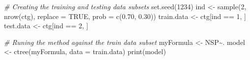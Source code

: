 \documentclass[
]{article}
\newenvironment{Shaded}{\begin{snugshade}}{\end{snugshade}}
\newcommand{\AttributeTok}[1]{\textcolor[rgb]{0.77,0.63,0.00}{#1}}
\newcommand{\CommentTok}[1]{\textcolor[rgb]{0.56,0.35,0.01}{\textit{#1}}}
\newcommand{\ConstantTok}[1]{\textcolor[rgb]{0.00,0.00,0.00}{#1}}
\newcommand{\DecValTok}[1]{\textcolor[rgb]{0.00,0.00,0.81}{#1}}
\newcommand{\FloatTok}[1]{\textcolor[rgb]{0.00,0.00,0.81}{#1}}
\newcommand{\FunctionTok}[1]{\textcolor[rgb]{0.00,0.00,0.00}{#1}}
\newcommand{\NormalTok}[1]{#1}
\newcommand{\OtherTok}[1]{\textcolor[rgb]{0.56,0.35,0.01}{#1}}
\newcommand{\SpecialCharTok}[1]{\textcolor[rgb]{0.00,0.00,0.00}{#1}}
\begin{document}
\begin{Shaded}
\begin{Highlighting}[]
\CommentTok{\# Creating the training and testing data subsets}
\FunctionTok{set.seed}\NormalTok{(}\DecValTok{1234}\NormalTok{)}
\NormalTok{ind }\OtherTok{\textless{}{-}} \FunctionTok{sample}\NormalTok{(}\DecValTok{2}\NormalTok{, }\FunctionTok{nrow}\NormalTok{(ctg), }\AttributeTok{replace =} \ConstantTok{TRUE}\NormalTok{, }\AttributeTok{prob =} \FunctionTok{c}\NormalTok{(}\FloatTok{0.70}\NormalTok{, }\FloatTok{0.30}\NormalTok{))}
\NormalTok{train.data }\OtherTok{\textless{}{-}}\NormalTok{ ctg[ind }\SpecialCharTok{==} \DecValTok{1}\NormalTok{, ]}
\NormalTok{test.data }\OtherTok{\textless{}{-}}\NormalTok{ ctg[ind }\SpecialCharTok{==} \DecValTok{2}\NormalTok{, ]}

\CommentTok{\# Runing the method against the train data subset}
\NormalTok{myFormula }\OtherTok{\textless{}{-}}\NormalTok{ NSP}\SpecialCharTok{\textasciitilde{}}\NormalTok{.}
\NormalTok{model }\OtherTok{\textless{}{-}} \FunctionTok{ctree}\NormalTok{(myFormula, }\AttributeTok{data =}\NormalTok{ train.data)}
\FunctionTok{print}\NormalTok{(model)}
\end{Highlighting}
\end{Shaded}
\end{document}
